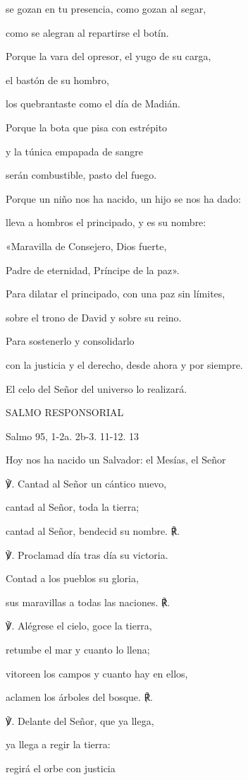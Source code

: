 se gozan en tu presencia, como gozan al segar,

como se alegran al repartirse el botín.

Porque la vara del opresor, el yugo de su carga,

el bastón de su hombro,

los quebrantaste como el día de Madián.

Porque la bota que pisa con estrépito

y la túnica empapada de sangre

serán combustible, pasto del fuego.

Porque un niño nos ha nacido, un hijo se nos ha dado:

lleva a hombros el principado, y es su nombre:

«Maravilla de Consejero, Dios fuerte,

Padre de eternidad, Príncipe de la paz».

Para dilatar el principado, con una paz sin límites,

sobre el trono de David y sobre su reino.

Para sostenerlo y consolidarlo

con la justicia y el derecho, desde ahora y por siempre.

El celo del Señor del universo lo realizará.

SALMO RESPONSORIAL

Salmo 95, 1-2a. 2b-3. 11-12. 13

Hoy nos ha nacido un Salvador: el Mesías, el Señor

℣. Cantad al Señor un cántico nuevo,

cantad al Señor, toda la tierra;

cantad al Señor, bendecid su nombre. ℟.

℣. Proclamad día tras día su victoria.

Contad a los pueblos su gloria,

sus maravillas a todas las naciones. ℟.

℣. Alégrese el cielo, goce la tierra,

retumbe el mar y cuanto lo llena;

vitoreen los campos y cuanto hay en ellos,

aclamen los árboles del bosque. ℟.

℣. Delante del Señor, que ya llega,

ya llega a regir la tierra:

regirá el orbe con justicia

